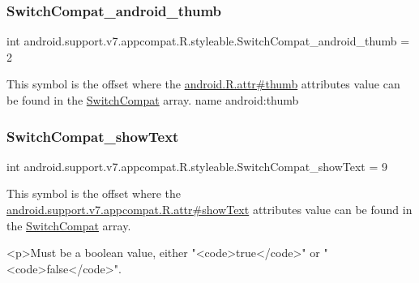 \subsubsection{\texorpdfstring{Switch\+Compat\+\_\+android\+\_\+thumb}{SwitchCompat\_android\_thumb}}
{\footnotesize\ttfamily int android.\+support.\+v7.\+appcompat.\+R.\+styleable.\+Switch\+Compat\+\_\+android\+\_\+thumb = 2\hspace{0.3cm}{\ttfamily [static]}}

This symbol is the offset where the \hyperlink{}{android.\+R.\+attr\#thumb} attribute\textquotesingle{}s value can be found in the \hyperlink{classandroid_1_1support_1_1v7_1_1appcompat_1_1R_1_1styleable_aabe688560752254f2288f3eaf9439737}{Switch\+Compat} array.  name android\+:thumb \mbox{\label{classandroid_1_1support_1_1v7_1_1appcompat_1_1R_1_1styleable_ae8db0533421066e36c386c0126adfebd}} 
\subsubsection{\texorpdfstring{Switch\+Compat\+\_\+show\+Text}{SwitchCompat\_showText}}
{\footnotesize\ttfamily int android.\+support.\+v7.\+appcompat.\+R.\+styleable.\+Switch\+Compat\+\_\+show\+Text = 9\hspace{0.3cm}{\ttfamily [static]}}

This symbol is the offset where the \hyperlink{classandroid_1_1support_1_1v7_1_1appcompat_1_1R_1_1attr_a0d2df05a7372eac5cd163b46c11f5dad}{android.\+support.\+v7.\+appcompat.\+R.\+attr\#show\+Text} attribute\textquotesingle{}s value can be found in the \hyperlink{classandroid_1_1support_1_1v7_1_1appcompat_1_1R_1_1styleable_aabe688560752254f2288f3eaf9439737}{Switch\+Compat} array.

\begin{DoxyVerb}      <p>Must be a boolean value, either "<code>true</code>" or "<code>false</code>".
\end{DoxyVerb}
 

